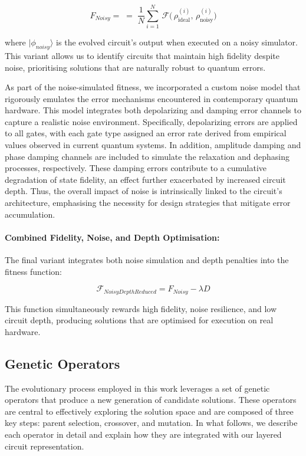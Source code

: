 \documentclass[11pt,a4paper]{article}
\begin{document}
\begin{equation}
    F_{Noisy} =  \;=\;
\frac{1}{N}\sum_{i=1}^{N} \,
\mathcal{F}\bigl(\,\rho_{\mathrm{ideal}}^{(i)}, \,\rho_{\mathrm{noisy}}^{(i)}\bigr)
\end{equation}

where $|\phi_{noisy}\rangle$ is the evolved circuit’s output when executed on a noisy simulator. This variant allows us to identify circuits that maintain high fidelity despite noise, prioritising solutions that are naturally robust to quantum errors.\newline

As part of the noise-simulated fitness, we incorporated a custom noise model that rigorously emulates the error mechanisms encountered in contemporary quantum hardware. This model integrates both depolarizing and damping error channels to capture a realistic noise environment. Specifically, depolarizing errors are applied to all gates, with each gate type assigned an error rate derived from empirical values observed in current quantum systems. In addition, amplitude damping and phase damping channels are included to simulate the relaxation and dephasing processes, respectively. These damping errors contribute to a cumulative degradation of state fidelity, an effect further exacerbated by increased circuit depth. Thus, the overall impact of noise is intrinsically linked to the circuit's architecture, emphasising the necessity for design strategies that mitigate error accumulation.


\paragraph*{Combined Fidelity, Noise, and Depth Optimisation:\newline}
The final variant integrates both noise simulation and depth penalties into the fitness function:

\begin{equation}
    \mathcal{F}_{NoisyDepthReduced} = F_{Noisy} - \lambda D
    \label{eq:1}
\end{equation}

This function simultaneously rewards high fidelity, noise resilience, and low circuit depth, producing solutions that are optimised for execution on real hardware.

\subsection{Genetic Operators}
The evolutionary process employed in this work leverages a set of genetic operators that produce a new generation of candidate solutions. These operators are central to effectively exploring the solution space and are composed of three key steps: parent selection, crossover, and mutation. In what follows, we describe each operator in detail and explain how they are integrated with our layered circuit representation.
\end{document}
